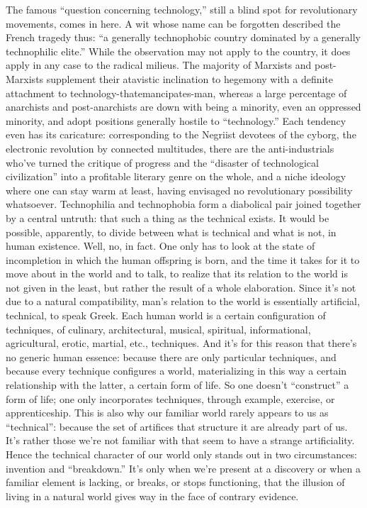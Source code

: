 \documentclass[landscape,twocolumn,letterpaper]{article}
\begin{document}
The famous “question concerning technology,” still a blind spot for
revolutionary movements, comes in here. A wit whose name can be
forgotten described the French tragedy thus: “a generally technophobic
country dominated by a generally technophilic elite.”  While the
observation may not apply to the country, it does apply in any case to
the radical milieus. The majority of Marxists and post-Marxists
supplement their atavistic inclination to hegemony with a definite
attachment to technology-thatemancipates-man, whereas a large
percentage of anarchists and post-anarchists are down with being a
minority, even an oppressed minority, and adopt positions generally
hostile to “technology.” Each tendency even has its caricature:
corresponding to the Negriist devotees of the cyborg, the electronic
revolution by connected multitudes, there are the anti-industrials
who’ve turned the critique of progress and the “disaster of
technological civilization” into a profitable literary genre on the
whole, and a niche ideology where one can stay warm at least, having
envisaged no revolutionary possibility whatsoever. Technophilia and
technophobia form a diabolical pair joined together by a central
untruth: that such a thing as the technical exists. It would be
possible, apparently, to divide between what is technical and what is
not, in human existence. Well, no, in fact. One only has to look at
the state of incompletion in which the human offspring is born, and
the time it takes for it to move about in the world and to talk, to
realize that its relation to the world is not given in the least, but
rather the result of a whole elaboration. Since it’s not due to a
natural compatibility, man’s relation to the world is essentially
artificial, technical, to speak Greek. Each human world is a certain
configuration of techniques, of culinary, architectural, musical,
spiritual, informational, agricultural, erotic, martial, etc.,
techniques. And it’s for this reason that there’s no generic human
essence: because there are only particular techniques, and because
every technique configures a world, materializing in this way a
certain relationship with the latter, a certain form of life. So one
doesn’t “construct” a form of life; one only incorporates techniques,
through example, exercise, or apprenticeship. This is also why our
familiar world rarely appears to us as “technical”: because the set of
artifices that structure it are already part of us. It’s rather those
we’re not familiar with that seem to have a strange
artificiality. Hence the technical character of our world only stands
out in two circumstances: invention and “breakdown.”  It’s only when
we’re present at a discovery or when a familiar element is lacking, or
breaks, or stops functioning, that the illusion of living in a natural
world gives way in the face of contrary evidence.
\end{document}
